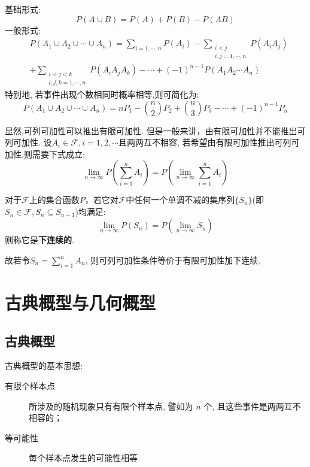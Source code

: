 \begin{corollary}[加法公式]
    基础形式:
    \[ P(A \cup B) = P(A) + P(B) - P(AB) \]
    一般形式:
    \begin{align*}
         & P\left(A_{1} \cup A_{2} \cup \cdots \cup A_{n}\right) =  \sum_{i=1, \cdots, n} P\left(A_{i}\right)-\sum_{\substack{i<j \\
        i, j=1, \cdots, n}} P\left(A_{i} A_{j}\right)                                                                             \\
         & +\sum_{\substack{i<j<k                                                                                                 \\i, j, k=1, \cdots, n}} P\left(A_{i} A_{j} A_{k}\right)-\cdots+(-1)^{n-1} P\left(A_{1} A_{2} \cdots A_{n}\right)
    \end{align*}
    特别地, 若事件出现个数相同时概率相等,则可简化为:
    \[ P\left(A_{1} \cup A_{2} \cup \cdots \cup A_{n}\right)=n P_{1} - \binom{n}{2} P_{2} + \binom{n}{3} P_{3}- \cdots+(-1)^{n-1} P_{n} \]
\end{corollary}

显然,可列可加性可以推出有限可加性. 但是一般来讲，由有限可加性并不能推出可列可加性. 设$A_i \in \mathscr{F}, i=1,2,\cdots $且两两互不相容, 若希望由有限可加性推出可列可加性,则需要下式成立:
\[ \lim_{n \to \infty}P(\sum_{i=1}^n A_i) =P(\lim_{n \to \infty}\sum_{i=1}^{n} A_i) \]

\begin{definition}
    对于$\mathscr{F}$上的集合函数$P$，若它对$\mathscr{F}$中任何一个单调不减的集序列$\{ S_n \}$(即$ S_n \in \mathscr{F}, S_n \subseteq  S_{n+1} $)均满足:
    \[ \lim_{n \to \infty}P(S_n) =P(\lim_{n \to \infty} S_n) \]
    则称它是\textbf{下连续的}.
\end{definition}

故若令$S_n = \sum_{i=1}^n A_n$, 则可列可加性条件等价于有限可加性加下连续.

\section{古典概型与几何概型}

\subsection{古典概型}

古典概型的基本思想:
\begin{description}
    \item[有限个样本点] 所涉及的随机现象只有有限个样本点, 譬如为 $n$ 个, 且这些事件是两两互不相容的；
    \item[等可能性] 每个样本点发生的可能性相等
\end{description}

